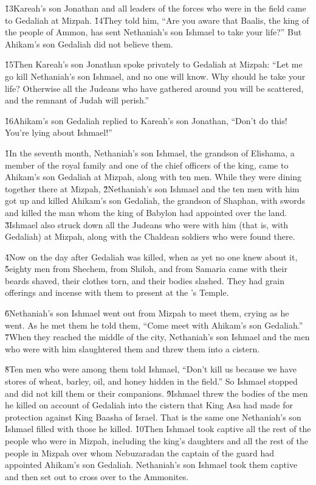 \v{13}Kareah's son Jonathan and all leaders of the forces who were in the field came to Gedaliah at Mizpah. \v{14}They told him, ``Are you aware that Baalis, the king of the people of Ammon, has sent Nethaniah's son Ishmael to take your life?'' But Ahikam's son Gedaliah did not believe them.

\v{15}Then Kareah's son Jonathan spoke privately to Gedaliah at Mizpah: ``Let me go kill Nethaniah's son Ishmael, and no one will know. Why should he take your life? Otherwise all the Judeans who have gathered around you will be scattered, and the remnant of Judah will perish.''

\v{16}Ahikam's son Gedaliah replied to Kareah's son Jonathan, ``Don't do this! You're lying about Ishmael!''

\v{1}In the seventh month, Nethaniah's son Ishmael, the grandson of Elishama, a member of the royal family and one of the chief officers of the king, came to Ahikam's son Gedaliah at Mizpah, along with ten men. While they were dining together there at Mizpah, \v{2}Nethaniah's son Ishmael and the ten men with him got up and killed Ahikam's son Gedaliah, the grandson of Shaphan, with swords and killed the man whom the king of Babylon had appointed over the land. \v{3}Ishmael also struck down all the Judeans who were with him (that is, with Gedaliah) at Mizpah, along with the Chaldean soldiers who were found there.

\v{4}Now on the day after Gedaliah was killed, when as yet no one knew about it, \v{5}eighty men from Shechem, from Shiloh, and from Samaria came with their beards shaved, their clothes torn, and their bodies slashed. They had grain offerings and incense with them to present at the 's Temple.

\v{6}Nethaniah's son Ishmael went out from Mizpah to meet them, crying as he went. As he met them he told them, ``Come meet with Ahikam's son Gedaliah.'' \v{7}When they reached the middle of the city, Nethaniah's son Ishmael and the men who were with him slaughtered them and threw them into a cistern.

\v{8}Ten men who were among them told Ishmael, ``Don't kill us because we have stores of wheat, barley, oil, and honey hidden in the field.'' So Ishmael stopped and did not kill them or their companions. \v{9}Ishmael threw the bodies of the men he killed on account of Gedaliah into the cistern that King Asa had made for protection against King Baasha of Israel. That is the same one Nethaniah's son Ishmael filled with those he killed. \v{10}Then Ishmael took captive all the rest of the people who were in Mizpah, including the king's daughters and all the rest of the people in Mizpah over whom Nebuzaradan the captain of the guard had appointed Ahikam's son Gedaliah. Nethaniah's son Ishmael took them captive and then set out to cross over to the Ammonites.

